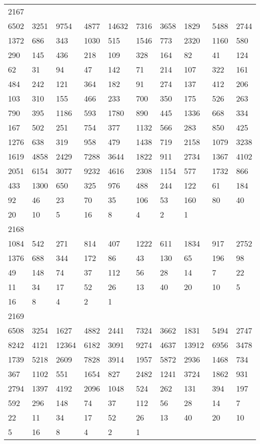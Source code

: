 \begin{longtable}{*{10}{l}}
2167&&&&&&&&&\\
6502& 3251& 9754& 4877& 14632& 7316& 3658& 1829& 5488& 2744\\
1372& 686& 343& 1030& 515& 1546& 773& 2320& 1160& 580\\
290& 145& 436& 218& 109& 328& 164& 82& 41& 124\\
62& 31& 94& 47& 142& 71& 214& 107& 322& 161\\
484& 242& 121& 364& 182& 91& 274& 137& 412& 206\\
103& 310& 155& 466& 233& 700& 350& 175& 526& 263\\
790& 395& 1186& 593& 1780& 890& 445& 1336& 668& 334\\
167& 502& 251& 754& 377& 1132& 566& 283& 850& 425\\
1276& 638& 319& 958& 479& 1438& 719& 2158& 1079& 3238\\
1619& 4858& 2429& 7288& 3644& 1822& 911& 2734& 1367& 4102\\
2051& 6154& 3077& 9232& 4616& 2308& 1154& 577& 1732& 866\\
433& 1300& 650& 325& 976& 488& 244& 122& 61& 184\\
92& 46& 23& 70& 35& 106& 53& 160& 80& 40\\
20& 10& 5& 16& 8& 4& 2& 1& \\

2168&&&&&&&&&\\
1084& 542& 271& 814& 407& 1222& 611& 1834& 917& 2752\\
1376& 688& 344& 172& 86& 43& 130& 65& 196& 98\\
49& 148& 74& 37& 112& 56& 28& 14& 7& 22\\
11& 34& 17& 52& 26& 13& 40& 20& 10& 5\\
16& 8& 4& 2& 1& \\

2169&&&&&&&&&\\
6508& 3254& 1627& 4882& 2441& 7324& 3662& 1831& 5494& 2747\\
8242& 4121& 12364& 6182& 3091& 9274& 4637& 13912& 6956& 3478\\
1739& 5218& 2609& 7828& 3914& 1957& 5872& 2936& 1468& 734\\
367& 1102& 551& 1654& 827& 2482& 1241& 3724& 1862& 931\\
2794& 1397& 4192& 2096& 1048& 524& 262& 131& 394& 197\\
592& 296& 148& 74& 37& 112& 56& 28& 14& 7\\
22& 11& 34& 17& 52& 26& 13& 40& 20& 10\\
5& 16& 8& 4& 2& 1& \\


\end{longtable}
